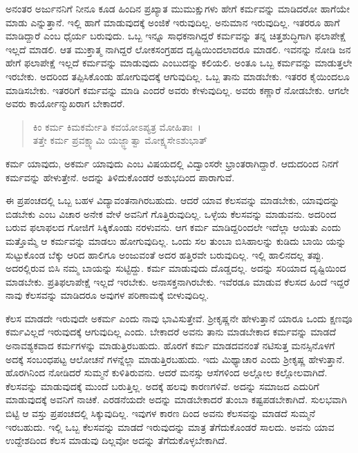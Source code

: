 ಅನಂತರ ಅರ್ಜುನನಿಗೆ ನೀನೂ ಕೂಡ ಹಿಂದಿನ ಪ್ರಖ್ಯಾತ ಮುಮುಕ್ಷುಗಳು ಹೇಗೆ ಕರ್ಮವನ್ನು ಮಾಡಿದರೋ ಹಾಗೆಯೇ ಮಾಡು ಎನ್ನುತ್ತಾನೆ. ಇಲ್ಲಿ ಹಾಗೆ ಮಾಡುವುದಕ್ಕೆ ಅಂಜಿಕೆ ಇರುವುದಿಲ್ಲ. ಅನುಮಾನ ಇರುವುದಿಲ್ಲ. ಇತರರೂ ಹಾಗೆ ಮಾಡಿದ್ದಾರೆ ಎಂಬ ಧೈರ್ಯ ಬರುವುದು. ಒಬ್ಬ ಇನ್ನೂ ಸಾಧಕನಾಗಿದ್ದರೆ ಕರ್ಮವನ್ನು ತನ್ನ ಚಿತ್ತಶುದ್ಧಿಗಾಗಿ ಫಲಾಪೇಕ್ಷೆ ಇಲ್ಲದೆ ಮಾಡಲಿ. ಆತ ಮುಕ್ತಾತ್ಮ ನಾಗಿದ್ದರೆ ಲೋಕಸಂಗ್ರಹದ ದೃಷ್ಟಿಯಿಂದಲಾದರೂ ಮಾಡಲಿ. ಇವನನ್ನು ನೋಡಿ ಜನ ಹೇಗೆ ಫಲಾಪೇಕ್ಷೆ ಇಲ್ಲದೆ ಕರ್ಮವನ್ನು ಮಾಡುವುದು ಎಂಬುದನ್ನು ಕಲಿಯಲಿ. ಅಂತೂ ಒಬ್ಬ ಕರ್ಮವನ್ನು ಮಾಡುತ್ತಲೇ ಇರಬೇಕು. ಅದರಿಂದ ತಪ್ಪಿಸಿಕೊಂಡು ಹೋಗುವುದಕ್ಕೆ ಆಗುವುದಿಲ್ಲ. ಒಬ್ಬ ತಾನು ಮಾಡಬೇಕು. ಇತರರ ಕೈಯಿಂದಲೂ ಮಾಡಿಸಬೇಕು. ಇತರರಿಗೆ ಕರ್ಮವನ್ನು ಮಾಡಿ ಎಂದರೆ ಅವರು ಕೇಳುವುದಿಲ್ಲ. ಅವರು ಕಣ್ಣಾರೆ ನೋಡಬೇಕು. ಆಗಲೇ ಅವರು ಕಾರ್ಯೋನ್ಮುಖರಾಗ ಬೇಕಾದರೆ.

\begin{verse}
ಕಿಂ ಕರ್ಮ ಕಿಮಕರ್ಮೇತಿ ಕವಯೋಽಪ್ಯತ್ರ ಮೋಹಿತಾಃ~।\\ತತ್ತೇ ಕರ್ಮ ಪ್ರವಕ್ಷ್ಯಾಮಿ ಯಜ್ಜ್ಞಾತ್ವಾ ಮೋಕ್ಷ್ಯಸೇಽಶುಭಾತ್ 
\end{verse}

{\small ಕರ್ಮ ಯಾವುದು, ಅಕರ್ಮ ಯಾವುದು ಎಂಬ ವಿಷಯದಲ್ಲಿ ವಿದ್ವಾಂಸರೇ ಭ್ರಾಂತರಾಗಿದ್ದಾರೆ. ಆದುದರಿಂದ ನಿನಗೆ ಕರ್ಮವನ್ನು ಹೇಳುತ್ತೇನೆ. ಅದನ್ನು ತಿಳಿದುಕೊಂಡರೆ ಅಶುಭದಿಂದ ಪಾರಾಗುವೆ.}

ಈ ಪ್ರಪಂಚದಲ್ಲಿ ಒಬ್ಬ ಬಹಳ ವಿದ್ಯಾವಂತನಾಗಿರಬಹುದು. ಆದರೆ ಯಾವ ಕೆಲಸವನ್ನು ಮಾಡಬೇಕು, ಯಾವುದನ್ನು ಬಿಡಬೇಕು ಎಂಬ ವಿಚಾರ ಅನೇಕ ವೇಳೆ ಅವನಿಗೆ ಗೊತ್ತಿರುವುದಿಲ್ಲ. ಒಳ್ಳೆಯ ಕೆಲಸವನ್ನು ಮಾಡುವನು. ಅದರಿಂದ ಬರುವ ಫಲಾಫಲದ ಗೋಜಿಗೆ ಸಿಕ್ಕಿಕೊಂಡು ನರಳುವನು. ಆಗ ಕರ್ಮ ಮಾಡಿದ್ದರಿಂದಲೇ ಇದೆಲ್ಲಾ ಆಯಿತು ಎಂದು ಮತ್ತೊಮ್ಮೆ ಆ ಕರ್ಮವನ್ನು ಮಾಡಲು ಹೋಗುವುದಿಲ್ಲ. ಒಂದು ಸಲ ತುಂಬಾ ಬಿಸಿಹಾಲನ್ನು ಕುಡಿದು ಬಾಯಿ ಯನ್ನು ಸುಟ್ಟುಕೊಂಡ ಬೆಕ್ಕು ಆರಿದ ಹಾಲಿಗೂ ಅಂಜುವಂತೆ ಅದರ ಹತ್ತಿರವೇ ಬರುವುದಿಲ್ಲ. ಇಲ್ಲಿ ಹಾಲಿನದಲ್ಲ ತಪ್ಪು. ಅದರಲ್ಲಿರುವ ಬಿಸಿ ನಮ್ಮ ಬಾಯನ್ನು ಸುಟ್ಟಿದ್ದು. ಕರ್ಮ ಮಾಡುವುದು ದೊಡ್ಡದಲ್ಲ. ಅದನ್ನು ಸರಿಯಾದ ದೃಷ್ಟಿಯಿಂದ ಮಾಡಬೇಕು. ಪ್ರತಿಫಲಾಪೇಕ್ಷೆ ಇಲ್ಲದೆ ಇರಬೇಕು. ಅನಾಸಕ್ತನಾಗಿರಬೇಕು. ಇವೆರಡೂ ಮಾಡುವ ಕೆಲಸದ ಹಿಂದೆ ಇದ್ದರೆ ನಾವು ಕೆಲಸವನ್ನು ಮಾಡಿದರೂ ಅವುಗಳ ಪರಿಣಾಮಕ್ಕೆ ಬೀಳುವುದಿಲ್ಲ.

ಕೆಲಸ ಮಾಡದೇ ಇರುವುದೇ ಅಕರ್ಮ ಎಂದು ನಾವು ಭಾವಿಸುತ್ತೇವೆ. ಶ‍್ರೀಕೃಷ್ಣನೇ ಹೇಳುತ್ತಾನೆ ಯಾರೂ ಒಂದು ಕ್ಷಣವೂ ಕರ್ಮವಿಲ್ಲದೆ ಇರುವುದಕ್ಕೆ ಆಗುವುದಿಲ್ಲ ಎಂದು. ಬೇಕಾದರೆ ಅವನು ತಾನು ಮಾಡಬೇಕಾದ ಕರ್ಮವನ್ನು ಮಾಡದೆ ಅನಾವಶ್ಯಕವಾದ ಕರ್ಮಗಳನ್ನು ಮಾಡುತ್ತಿರಬಹುದು. ಹೊರಗೆ ಕರ್ಮ ಮಾಡದವನಂತೆ ನಟಿಸುತ್ತ ಮನಸ್ಸಿನೊಳಗೆ ಅದಕ್ಕೆ ಸಂಬಂಧಪಟ್ಟ ಆಲೋಚನೆ ಗಳನ್ನೆಲ್ಲಾ ಮಾಡುತ್ತಿರಬಹುದು. ಇದು ಮಿಥ್ಯಾಚಾರ ಎಂದು ಶ‍್ರೀಕೃಷ್ಣ ಹೇಳುತ್ತಾನೆ. ಹೊರಗಿನಿಂದ ನೋಡಿದರೆ ಸುಮ್ಮನೆ ಕುಳಿತಿರುವನು. ಆದರೆ ಮನಸ್ಸು ಆಸೆಗಳಿಂದ ಅಲ್ಲೋಲ ಕಲ್ಲೋಲವಾಗಿದೆ. ಕೆಲಸವನ್ನು ಮಾಡುವುದಕ್ಕೆ ಮುಂದೆ ಬರುತ್ತಿಲ್ಲ. ಅದಕ್ಕೆ ಹಲವು ಕಾರಣಗಳಿವೆ. ಅದನ್ನು ಸಮಾಜದ ಎದುರಿಗೆ ಮಾಡುವುದಕ್ಕೆ ಅವನಿಗೆ ನಾಚಿಕೆ. ಎರಡನೆಯದೇ ಅದನ್ನು ಮಾಡಬೇಕಾದರೆ ತುಂಬಾ ಕಷ್ಟಪಡಬೇಕಾಗಿದೆ. ಸುಲಭವಾಗಿ ಬಿಟ್ಟಿ ಆ ವಸ್ತು ಪ್ರಪಂಚದಲ್ಲಿ ಸಿಕ್ಕುವುದಿಲ್ಲ. ಇವುಗಳ ಕಾರಣ ದಿಂದ ಅವನು ಕೆಲಸವನ್ನು ಮಾಡದೆ ಸುಮ್ಮನೆ ಇರಬಹುದು. ಇಲ್ಲಿ ಒಬ್ಬ ಕೆಲಸವನ್ನು ಮಾಡದೆ ಇರುವುದನ್ನು ಮಾತ್ರ ತೆಗೆದುಕೊಂಡರೆ ಸಾಲದು. ಅವನು ಯಾವ ಉದ್ದೇಶದಿಂದ ಕೆಲಸ ಮಾಡುವು ದಿಲ್ಲವೋ ಅದನ್ನು ತೆಗೆದುಕೊಳ್ಳಬೇಕಾಗಿದೆ.

